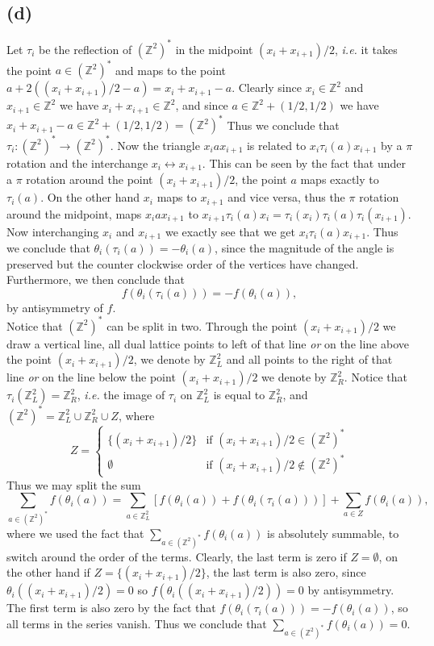 \documentclass[a4paper,11pt]{article}
\newcommand{\ie}{\emph{i.e.} }
\newcommand{\Z}{\mathbb{Z}}
\numberwithin{equation}{section}
\begin{document}
\subsection*{(d)}
Let $ \tau_i $ be the reflection of $ (\Z^2)^* $ in the midpoint $ (x_i+x_{i+1})/2 $, \ie it takes the point $ a\in(\Z^2)^* $ and maps to the point $ a+2((x_i+x_{i+1})/2-a)=x_i+x_{i+1}-a $. Clearly since $ x_i\in \Z^2 $ and $ x_{i+1}\in\Z^2 $ we have $ x_i+x_{i+1}\in\Z^2 $, and since $ a\in\Z^2+(1/2,1/2) $ we have $ x_i+x_{i+1}-a \in\Z^2+(1/2,1/2)=(\Z^2)^* $ Thus we conclude that $ \tau_i:(\Z^2)^*\to(\Z^2)^* $. Now the triangle $ x_iax_{i+1} $ is related to $ x_i\tau_i(a)x_{i+1} $ by a $ \pi $ rotation and the interchange $ x_i\leftrightarrow x_{i+1} $. This can be seen by the fact that under a $ \pi $ rotation around the point $ (x_i+x_{i+1})/2 $, the point $ a $ maps exactly to $ \tau_i(a) $. On the other hand $ x_i $ maps to $ x_{i+1} $ and vice versa, thus the $ \pi $ rotation around the midpoint, maps $ x_iax_{i+1} $ to $ x_{i+1}\tau_i(a)x_i=\tau_i(x_i)\tau_i(a)\tau_i(x_{i+1}) $. Now interchanging $ x_i $ and $ x_{i+1} $ we exactly see that we get $ x_i\tau_i(a)x_{i+1} $. Thus we conclude that $ \theta_i(\tau_i(a))=-\theta_i(a) $, since the magnitude of the angle is preserved but the counter clockwise order of the vertices have changed. Furthermore, we then conclude that \begin{equation}
f(\theta_i(\tau_i(a)))=-f(\theta_i(a)),
\end{equation}
by antisymmetry of $ f $.\\
Notice that $ (\Z^2)^*$ can be split in two. Through the point $ (x_i+x_{i+1})/2 $ we draw a vertical line, all dual lattice points to left of that line \emph{or} on the line above the point $ (x_i+x_{i+1})/2 $, we denote by $ \Z^2_L $ and all points to the right of that line \emph{or} on the line below the point $ (x_i+x_{i+1})/2 $ we denote by $ \Z^2_R $. Notice that $ \tau_i(\Z^2_L)=\Z^2_R $, \ie the image of $ \tau_i $ on $ \Z^2_L $ is equal to $ \Z^2_R $, and $ (\Z^2)^*=\Z^2_L\cup\Z^2_R\cup Z $, where \begin{equation}
Z=\begin{cases}
\{ (x_i+x_{i+1})/2 \}&\text{if } (x_i+x_{i+1})/2\in(\Z^2)^*\\
\emptyset&\text{if }  (x_i+x_{i+1})/2\notin(\Z^2)^*
\end{cases}
\end{equation}
Thus we may split the sum\begin{equation}
\sum_{a\in(\Z^2)^*}f(\theta_i(a))=\sum_{a\in\Z^2_L}\left[f(\theta_i(a))+f(\theta_i(\tau_i(a)))\right]+\sum_{a\in Z}f(\theta_i(a)),
\end{equation}
where we used the fact that $ \sum_{a\in(\Z^2)^*}f(\theta_i(a)) $ is absolutely summable, to switch around the order of the terms.
Clearly, the last term is zero if $ Z=\emptyset $, on the other hand if $ Z=\{(x_i+x_{i+1})/2\} $, the last term is also zero, since $ \theta_i((x_i+x_{i+1})/2)=0 $ so $ f(\theta_i((x_i+x_{i+1})/2))=0 $ by antisymmetry. The first term is also zero by the fact that $ f(\theta_i(\tau_i(a)))=-f(\theta_i(a)) $, so all terms in the series vanish. Thus we conclude that $ \sum_{a\in(\Z^2)^*}f(\theta_i(a))=0 $.
\end{document}
